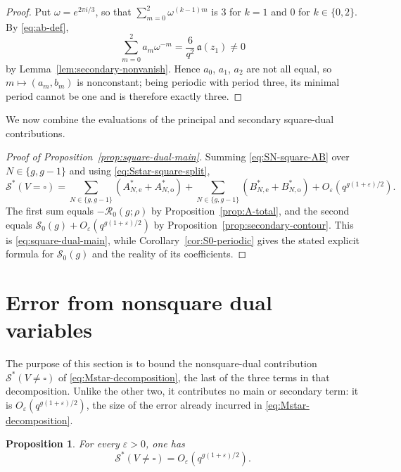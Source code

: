 \documentclass[a4paper,reqno]{amsart}
\numberwithin{equation}{section}
\newtheorem{proposition}[theorem]{Proposition}
\theoremstyle{remark}
\theoremstyle{definition}
\begin{document}
\begin{proof}
Put $\omega=e^{2\pi i/3}$, so that $\sum_{m=0}^{2}\omega^{(k-1)m}$ is $3$
for $k=1$ and $0$ for $k\in\{0,2\}$. By \eqref{eq:ab-def},
$$
\sum_{m=0}^{2}a_m\omega^{-m}
=
\frac{6}{q^2}\,\mathfrak a(z_1)
\ne0
$$
by Lemma~\ref{lem:secondary-nonvanish}. Hence $a_0$, $a_1$, $a_2$ are not
all equal, so $m\mapsto(a_m,b_m)$ is nonconstant; being periodic with
period three, its minimal period cannot be one and is therefore exactly
three.
\end{proof}

We now combine the evaluations of the principal and secondary
square-dual contributions.

\begin{proof}[Proof of Proposition~\ref{prop:square-dual-main}]
Summing \eqref{eq:SN-square-AB} over $N\in\{g,g-1\}$ and using
\eqref{eq:Sstar-square-split},
$$
\mathcal S^*(V=\square)
=
\sum_{N\in\{g,g-1\}}\left(A_{N,\mathrm e}^{*}+A_{N,\mathrm o}^{*}\right)
+
\sum_{N\in\{g,g-1\}}\left(B_{N,\mathrm e}^{*}+B_{N,\mathrm o}^{*}\right)
+
O_\varepsilon\!\left(q^{g(1+\varepsilon)/2}\right).
$$
The first sum equals $-\mathcal R_0(g;\rho)$ by
Proposition~\ref{prop:A-total}, and the second equals
$\mathcal S_0(g)+O_\varepsilon(q^{g(1+\varepsilon)/2})$ by
Proposition~\ref{prop:secondary-contour}. This is \eqref{eq:square-dual-main},
while Corollary~\ref{cor:S0-periodic} gives the stated explicit formula for
$\mathcal S_0(g)$ and the reality of its coefficients.
\end{proof}

\section{Error from nonsquare dual variables}\label{sec:nonsquare}

The purpose of this section is to bound the nonsquare-dual contribution
$\mathcal S^*(V\ne\square)$ of \eqref{eq:Mstar-decomposition}, the last of
the three terms in that decomposition. Unlike the other two, it contributes
no main or secondary term: it is $O_\varepsilon(q^{g(1+\varepsilon)/2})$,
the size of the error already incurred in \eqref{eq:Mstar-decomposition}.

\begin{proposition}
\label{prop:nonsquare}
For every $\varepsilon>0$, one has
\begin{equation}\label{eq:nonsquare-bound}
\mathcal S^*(V\ne\square)
=
O_\varepsilon\!\left(q^{g(1+\varepsilon)/2}\right).
\end{equation}
\end{proposition}
\end{document}

